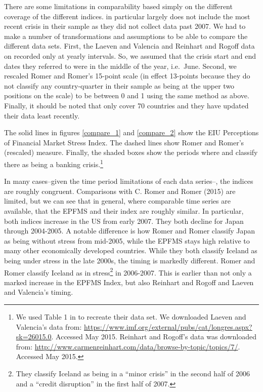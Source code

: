 \documentclass[]{article}
\begin{document}
There are some limitations in comparability based simply on the
different coverage of the different indices. \cite{Romer2015}
in particular largely does not include the most recent crisis in their
sample as they did not collect data past 2007. We had to make a number
of transformations and assumptions to be able to compare the different
data sets. First, the Laeven and Valencia and Reinhart and Rogoff data
on recorded only at yearly intervals. So, we assumed that the crisis
start and end dates they referred to were in the middle of the year,
i.e.~June. Second, we rescaled Romer and Romer's 15-point scale (in
effect 13-points because they do not classify any country-quarter in
their sample as being at the upper two positions on the scale) to be
between 0 and 1 using the same method as above. Finally, it should be
noted that \cite{Reinhart2009} only cover 70 countries and they
have updated their data least recently.

The solid lines in figures \ref{compare_1} and \ref{compare_2} show the
EIU Perceptions of Financial Market Stress Index. The dashed lines show
Romer and Romer's (rescaled) measure. Finally, the shaded boxes show the
periods where \cite{laeven2013} and \cite{Reinhart2009}
classify there as being a banking crisis.\footnote{We used Table 1 in \cite{Romer2015} to recreate their data set. We downloaded
  Laeven and Valencia's data from:
  \url{https://www.imf.org/external/pubs/cat/longres.aspx?sk=26015.0}.
  Accessed May 2015. Reinhart and Rogoff's data was downloaded from:
  \url{http://www.carmenreinhart.com/data/browse-by-topic/topics/7/}.
  Accessed May 2015.}

In many cases--given the time period limitations of each data series--,
the indices are roughly congruent. Comparisons with C. Romer and Romer
(2015) are limited, but we can see that in general, where comparable
time series are available, that the EPFMS and their index are roughly
similar. In particular, both indices increase in the US from early 2007.
They both decline for Japan through 2004-2005. A notable difference is
how Romer and Romer classify Japan as being without stress from
mid-2005, while the EPFMS stays high relative to many other economically
developed countries. While they both classify Iceland as being under
stress in the late 2000s, the timing is markedly different. Romer and
Romer classify Iceland as in stress\footnote{They classify Iceland as
  being in a ``minor crisis'' in the second half of 2006 and a ``credit
  disruption'' in the first half of 2007.} in 2006-2007. This is earlier
than not only a marked increase in the EPFMS Index, but also Reinhart
and Rogoff and Laeven and Valencia's timing.
\end{document}
